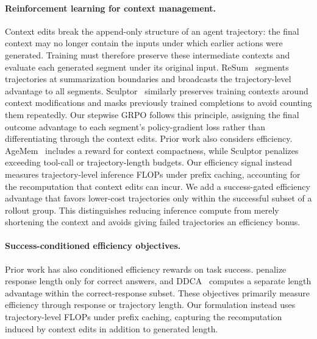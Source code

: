 \paragraph{Reinforcement learning for context management.}
Context edits break the append-only structure of an agent trajectory: the final context may no longer contain the inputs under which earlier actions were generated. Training must therefore preserve these intermediate contexts and evaluate each generated segment under its original input. ReSum~\citep{wu2025resum} segments trajectories at summarization boundaries and broadcasts the trajectory-level advantage to all segments. Sculptor~\citep{li2026sculptor} similarly preserves training contexts around context modifications and masks previously trained completions to avoid counting them repeatedly. Our stepwise GRPO follows this principle, assigning the final outcome advantage to each segment's policy-gradient loss rather than differentiating through the context edits.
Prior work also considers efficiency. AgeMem~\citep{yu2026agentic} includes a reward for context compactness, while Sculptor penalizes exceeding tool-call or trajectory-length budgets. Our efficiency signal instead measures trajectory-level inference FLOPs under prefix caching, accounting for the recomputation that context edits can incur. We add a success-gated efficiency advantage that favors lower-cost trajectories only within the successful subset of a rollout group. This distinguishes reducing inference compute from merely shortening the context and avoids giving failed trajectories an efficiency bonus.


\paragraph{Success-conditioned efficiency objectives.} Prior work has also conditioned efficiency rewards on task success. \citet{arora2026training} penalize response length only for correct answers, and DDCA~\citep{peng2026think} computes a separate length advantage within the correct-response subset. These objectives primarily measure efficiency through response or trajectory length. Our formulation instead uses trajectory-level FLOPs under prefix caching, capturing the recomputation induced by context edits in addition to generated length.

